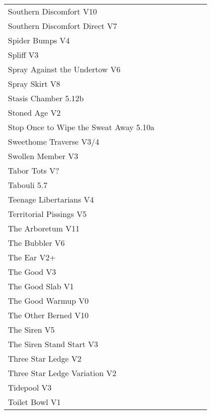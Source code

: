 \begin{flushleft}
\begin{center}
\begin{supertabular}{p{0.76\linewidth}p{0.08\linewidth}}
Southern Discomfort V10 & \pageref{rt:Southern Discomfort} \\
Southern Discomfort Direct V7 & \pageref{vr:Southern Discomfort Direct} \\
Spider Bumps V4 & \pageref{rt:Spider Bumps} \\
Spliff V3 & \pageref{rt:Spliff} \\
Spray Against the Undertow V6 & \pageref{vr:Spray Against the Undertow} \\
Spray Skirt V8 & \pageref{rt:Spray Skirt} \\
Stasis Chamber 5.12b & \pageref{rt:Stasis Chamber} \\
Stoned Age V2 & \pageref{rt:Stoned Age} \\
Stop Once to Wipe the Sweat Away 5.10a & \pageref{rt:Stop Once to Wipe the Sweat Away} \\
Sweethome Traverse V3/4 & \pageref{vr:Sweethome Traverse} \\
Swollen Member V3 & \pageref{rt:Swollen Member} \\
Tabor Tots V? & \pageref{vr:Tabor Tots} \\
Tabouli 5.7 & \pageref{rt:Tabouli} \\
Teenage Libertarians V4 & \pageref{rt:Teenage Libertarians} \\
Territorial Pissings V5 & \pageref{rt:Territorial Pissings} \\
The Arboretum V11 & \pageref{rt:The Arboretum} \\
The Bubbler V6 & \pageref{rt:The Bubbler} \\
The Ear V2+ & \pageref{rt:The Ear} \\
The Good V3 & \pageref{rt:The Good} \\
The Good Slab V1 & \pageref{rt:The Good Slab} \\
The Good Warmup V0 & \pageref{rt:The Good Warmup} \\
The Other Berned V10 & \pageref{rt:The Other Berned} \\
The Siren V5 & \pageref{rt:The Siren} \\
The Siren Stand Start V3 & \pageref{vr:The Siren Stand Start} \\
Three Star Ledge V2 & \pageref{rt:Three Star Ledge} \\
Three Star Ledge Variation V2 & \pageref{vr:Three Star Ledge Variation} \\
Tidepool V3 & \pageref{rt:Tidepool} \\
Toilet Bowl V1 & \pageref{rt:Toilet Bowl} \\

\end{supertabular}
\end{center}
\end{flushleft}
